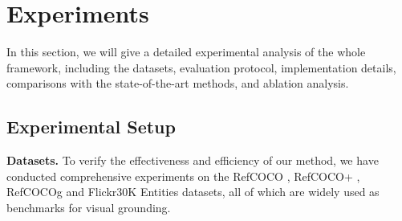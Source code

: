 

\section{Experiments}
In this section, we will give a detailed experimental analysis of the whole framework, including the datasets, evaluation protocol, implementation details, comparisons with the state-of-the-art methods, and ablation analysis.

\subsection{Experimental Setup}
\noindent \textbf{Datasets.}
To verify the effectiveness and efficiency of our method, we have conducted comprehensive experiments on the RefCOCO \cite{yu2016modeling}, RefCOCO+ \cite{yu2016modeling}, RefCOCOg \cite{mao2016refcocogg,nagaraja2016refcocogu} and Flickr30K Entities \cite{plummer2015flickr30k} datasets, all of which are widely used as benchmarks for visual grounding.

